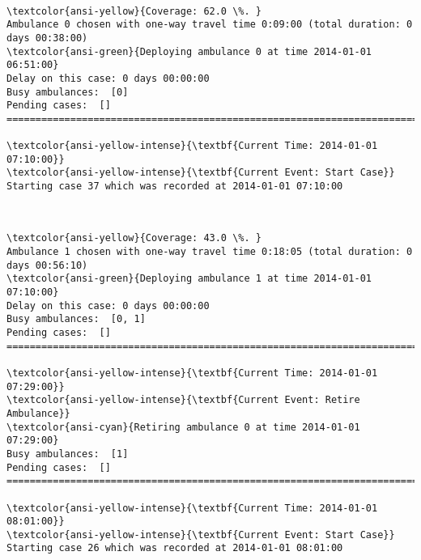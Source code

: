 \documentclass[11pt]{article}
\begin{document}
    \begin{center}
    \end{center}
    { \hspace*{\fill} \\}
    
    \begin{Verbatim}[commandchars=\\\{\}]
\textcolor{ansi-yellow}{Coverage: 62.0 \%. }
Ambulance 0 chosen with one-way travel time 0:09:00 (total duration: 0 days 00:38:00)
\textcolor{ansi-green}{Deploying ambulance 0 at time 2014-01-01 06:51:00}
Delay on this case: 0 days 00:00:00
Busy ambulances:  [0]
Pending cases:  []
========================================================================

\textcolor{ansi-yellow-intense}{\textbf{Current Time: 2014-01-01 07:10:00}}
\textcolor{ansi-yellow-intense}{\textbf{Current Event: Start Case}}
Starting case 37 which was recorded at 2014-01-01 07:10:00

    \end{Verbatim}

    \begin{center}
    \end{center}
    { \hspace*{\fill} \\}
    
    \begin{Verbatim}[commandchars=\\\{\}]
\textcolor{ansi-yellow}{Coverage: 43.0 \%. }
Ambulance 1 chosen with one-way travel time 0:18:05 (total duration: 0 days 00:56:10)
\textcolor{ansi-green}{Deploying ambulance 1 at time 2014-01-01 07:10:00}
Delay on this case: 0 days 00:00:00
Busy ambulances:  [0, 1]
Pending cases:  []
========================================================================

\textcolor{ansi-yellow-intense}{\textbf{Current Time: 2014-01-01 07:29:00}}
\textcolor{ansi-yellow-intense}{\textbf{Current Event: Retire Ambulance}}
\textcolor{ansi-cyan}{Retiring ambulance 0 at time 2014-01-01 07:29:00}
Busy ambulances:  [1]
Pending cases:  []
========================================================================

\textcolor{ansi-yellow-intense}{\textbf{Current Time: 2014-01-01 08:01:00}}
\textcolor{ansi-yellow-intense}{\textbf{Current Event: Start Case}}
Starting case 26 which was recorded at 2014-01-01 08:01:00

    \end{Verbatim}
\end{document}

